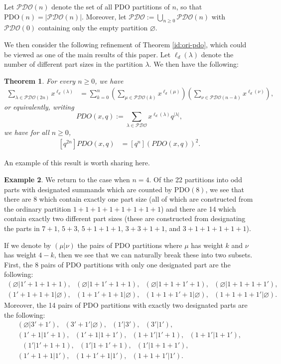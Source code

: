 \documentclass[11pt,reqno]{amsart}
\numberwithin{equation}{section}
\theoremstyle{plain}
\newtheorem{theorem}{Theorem}[section]
\theoremstyle{definition}
\newtheorem{example}[theorem]{Example}
\theoremstyle{named}
\newcommand{\abs}[1]{\left|#1\right|}
\def\PDOset{\mathcal{PDO}}
\def\PDO{\mathrm{PDO}}
\def\ld{\ell_d}
\begin{document}
Let $\PDOset(n)$ denote the set of all PDO partitions of $n$, so that $\PDO(n) = |\PDOset(n)|$. Moreover, let $\PDOset:=\bigcup_{n\ge 0}\PDOset(n)$ with $\PDOset(0)$ containing only the empty partition $\varnothing$. 

We then consider the following refinement of Theorem \ref{id:ori-pdo}, which could be viewed as one of the main results of this paper. Let $\ld(\lambda)$ denote the number of different part sizes in the partition $\lambda$. We then have the following:  
\begin{theorem}\label{thm:refine-pdo}
For every $n\ge 0$, we have
\begin{align}\label{id:refine-pdo}
\sum_{\lambda\in\PDOset(2n)} x^{\ld(\lambda)} &= \sum_{k=0}^{n}\left(\sum_{\mu\in\PDOset(k)}x^{\ld(\mu)}\right)\left(\sum_{\nu\in\PDOset(n-k)}x^{\ld(\nu)}\right),
\end{align}
or equivalently, writing 
$$
PDO(x,q):=\sum_{\lambda\in\PDOset}x^{\ld(\lambda)}q^{\abs{\lambda}},
$$
we have for all $n\ge 0$,
\begin{align}\label{id:refine-pdo2}
[q^{2n}]PDO(x,q) &= [q^n]\left(PDO(x,q)\right)^2.
\end{align}
\end{theorem}
An example of this result is worth sharing here.  

\begin{example}
We return to the case when $n=4$.  Of the 22 partitions into odd parts with designated summands which are counted by $\PDO(8)$, we see that there are 8 which contain exactly one part size (all of which are constructed from the ordinary partition $1+1+1+1+1+1+1+1$) and there are 14 which contain exactly two different part sizes (these are constructed from designating the parts in $7+1$, $5+3$, $5+1+1+1$, $3+3+1+1$, and $3+1+1+1+1+1$).  

If we denote by $(\mu | \nu)$ the pairs of $\PDO$ partitions where $\mu$ has weight $k$ and $\nu$ has weight $4-k$, then we see that we can naturally break these into two subsets.  First, the 8 pairs of $\PDO$ partitions with only one designated part are the following:  
\begin{gather*}
    (\varnothing | 1'+1+1+1), \ \ \  (\varnothing | 1+1'+1+1), \ \ \  (\varnothing | 1+1+1'+1), \ \ \  (\varnothing | 1+1+1+1'),\\
(1'+1+1+1 | \varnothing), \ \ \  (1+1'+1+1 | \varnothing), \ \ \ (1+1+1'+1 | \varnothing), \ \ \ (1+1+1+1' | \varnothing). 
\end{gather*}
Moreover, the 14 pairs of $\PDO$ partitions with exactly two designated parts are the following: 
\begin{gather*}
    (\varnothing | 3'+1'), \ \ \  (3'+1' | \varnothing), \ \ \  (1' | 3'), \ \ \ (3' | 1'), \\
(1'+1 | 1'+1), \ \ \  (1'+1 | 1+1'),\ \ \ (1+1' | 1'+1), \ \ \  (1+1' | 1+1'),\\
 \ \ \ (1' | 1'+1+1 ), \ \ \ (1' | 1+1'+1 ), \ \ \ (1' | 1+1+1' ), \\
 (1'+1+1 | 1'), \ \ \ (1+1'+1 | 1'), \ \ \ (1+1+1' | 1'). 
\end{gather*}
\end{example}
\end{document}
